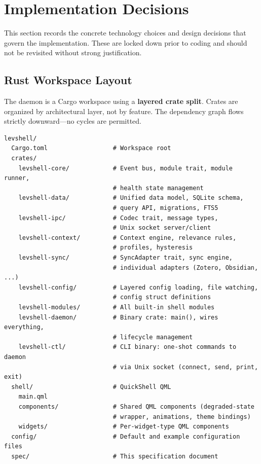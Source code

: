 \documentclass[11pt,a4paper]{article}
\begin{document}
\section{Implementation Decisions}
\label{sec:impl-decisions}

This section records the concrete technology choices and design decisions that govern the implementation. These are locked down prior to coding and should not be revisited without strong justification.

\subsection{Rust Workspace Layout}
\label{sec:workspace-layout}

The daemon is a Cargo workspace using a \textbf{layered crate split}. Crates are organized by architectural layer, not by feature. The dependency graph flows strictly downward---no cycles are permitted.

\begin{lstlisting}[language={}]
levshell/
  Cargo.toml                  # Workspace root
  crates/
    levshell-core/            # Event bus, module trait, module runner,
                              # health state management
    levshell-data/            # Unified data model, SQLite schema,
                              # query API, migrations, FTS5
    levshell-ipc/             # Codec trait, message types,
                              # Unix socket server/client
    levshell-context/         # Context engine, relevance rules,
                              # profiles, hysteresis
    levshell-sync/            # SyncAdapter trait, sync engine,
                              # individual adapters (Zotero, Obsidian, ...)
    levshell-config/          # Layered config loading, file watching,
                              # config struct definitions
    levshell-modules/         # All built-in shell modules
    levshell-daemon/          # Binary crate: main(), wires everything,
                              # lifecycle management
    levshell-ctl/             # CLI binary: one-shot commands to daemon
                              # via Unix socket (connect, send, print, exit)
  shell/                      # QuickShell QML
    main.qml
    components/               # Shared QML components (degraded-state
                              # wrapper, animations, theme bindings)
    widgets/                  # Per-widget-type QML components
  config/                     # Default and example configuration files
  spec/                       # This specification document
\end{lstlisting}
\end{document}
